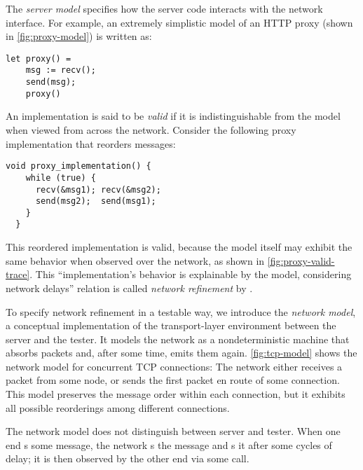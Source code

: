 The {\em server model} specifies how the server code
interacts with the network interface.  For example, an extremely simplistic model of
an HTTP proxy
(shown in \autoref{fig:proxy-model}) is written as:

\begin{lstlisting}[style=customcoq]
let proxy() =
    msg := recv();
    send(msg);
    proxy()
\end{lstlisting}

An implementation is said to be {\em valid} if it is indistinguishable from
the model when viewed from across the network.  Consider
the following proxy implementation that reorders messages:

\begin{lstlisting}[style=customc]
  void proxy_implementation() {
    while (true) {
      recv(&msg1); recv(&msg2);
      send(msg2);  send(msg1);
    }
  }
\end{lstlisting}
This reordered implementation is valid, because the model itself may
exhibit the same behavior when observed over the network, as shown in
\autoref{fig:proxy-valid-trace}.  This ``implementation's behavior is
explainable by the model, considering network delays''
relation is called {\em network refinement} by
\textcite{cpp19}.

To specify network refinement in a testable way, we introduce
the {\em network model}, a conceptual implementation of the transport-layer
environment between the server and the tester.  It models the network as a
nondeterministic machine that absorbs packets and,  after some time, emits
them again.  \autoref{fig:tcp-model} shows the network model for concurrent TCP
connections: The network
either
receives a packet from some node, or sends the first packet en route of some
connection.  This model preserves the message order within each connection,
but it exhibits all possible reorderings among different connections.

The network model does not distinguish between server and tester.  When one end
s some message, the network s the message and s it
after some cycles of delay; it is then observed by the other end via some
 call.


